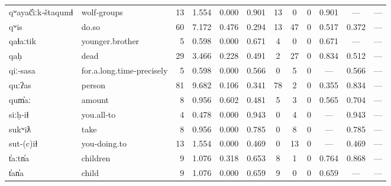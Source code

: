 \begin{landscape}
\begin{longtable}[c]{ l l | r r c c | c c c | c c c }
  qʷayač̓iːk‑štaqumɬ  & wolf‑groups               & 13  & 1.554                     & 0.000           & 0.901      & 13        & 0           & 0            & 0.901     & —           & —\\
  qʷis               & do.so                     & 60  & 7.172                     & 0.476           & 0.294      & 13        & 47          & 0            & 0.517     & 0.372       & —\\
  qaɬaːtik           & younger.brother           & 5   & 0.598                     & 0.000           & 0.671      & 4         & 0           & 0            & 0.671     & —           & —\\
  qaḥ                & dead                      & 29  & 3.466                     & 0.228           & 0.491      & 2         & 27          & 0            & 0.834     & 0.512       & —\\
  qiː‑sasa           & for.a.long.time‑precisely & 5   & 0.598                     & 0.000           & 0.566      & 0         & 5           & 0            & —         & 0.566       & —\\
  quːʔas             & person                    & 81  & 9.682                     & 0.106           & 0.341      & 78        & 2           & 0            & 0.355     & 0.834       & —\\
  qum̓aː              & amount                    & 8   & 0.956                     & 0.602           & 0.481      & 5         & 3           & 0            & 0.565     & 0.704       & —\\
  siːḥ‑iɬ            & you.all‑to                & 4   & 0.478                     & 0.000           & 0.943      & 0         & 4           & 0            & —         & 0.943       & —\\
  sukʷiƛ             & take                      & 8   & 0.956                     & 0.000           & 0.785      & 0         & 8           & 0            & —         & 0.785       & —\\
  sut‑(c)iɬ          & you‑doing.to              & 13  & 1.554                     & 0.000           & 0.469      & 0         & 13          & 0            & —         & 0.469       & —\\
  t̓aːtn̓a             & children                  & 9   & 1.076                     & 0.318           & 0.653      & 8         & 1           & 0            & 0.764     & 0.868       & —\\
  t̓an̓a               & child                     & 9   & 1.076                     & 0.000           & 0.659      & 9         & 0           & 0            & 0.659     & —           & —\\

\end{longtable}
\end{landscape}

